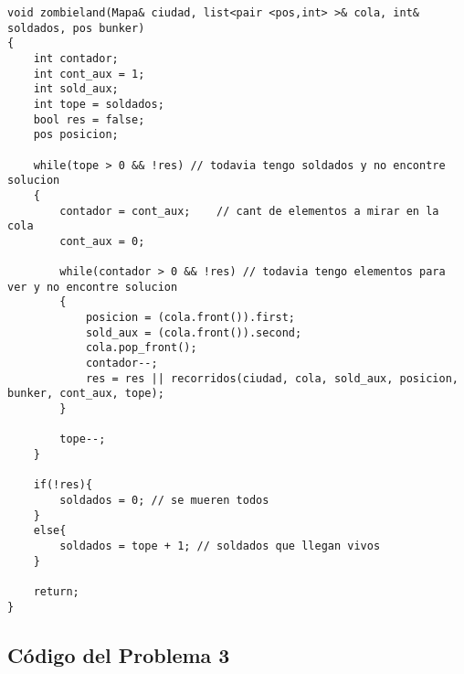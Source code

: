 \documentclass[a4paper]{article}
\begin{document}
\vspace*{0.5cm}

\begin{lstlisting}
void zombieland(Mapa& ciudad, list<pair <pos,int> >& cola, int& soldados, pos bunker)
{
	int contador;
	int cont_aux = 1;
	int sold_aux;
	int tope = soldados;
	bool res = false;
	pos posicion;
	
	while(tope > 0 && !res)	// todavia tengo soldados y no encontre solucion
	{
		contador = cont_aux;	// cant de elementos a mirar en la cola
		cont_aux = 0;
		
		while(contador > 0 && !res)	// todavia tengo elementos para ver y no encontre solucion
		{
			posicion = (cola.front()).first;
			sold_aux = (cola.front()).second;
			cola.pop_front();
			contador--;
	 		res = res || recorridos(ciudad, cola, sold_aux, posicion, bunker, cont_aux, tope);
		}
		
		tope--;
	}
	
	if(!res){ 
		soldados = 0; // se mueren todos
	}
	else{
		soldados = tope + 1; // soldados que llegan vivos
	}

	return;
}

\end{lstlisting}

\subsection{Código del Problema 3}
\end{document}
